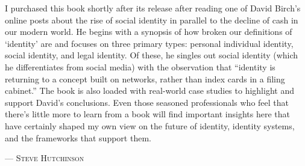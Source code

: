I purchased this book shortly after its release after reading one of David Birch’s online posts about the rise of social identity in parallel to the decline of cash in our modern world. He begins with a synopsis of how broken our definitions of ‘identity’ are and focuses on three primary types: personal individual identity, social identity, and legal identity. Of these, he singles out social identity (which he differentiates from social media) with the observation that “identity is returning to a concept built on networks, rather than index cards in a filing cabinet.” The book is also loaded with real-world case studies to highlight and support David’s conclusions. Even those seasoned professionals who feel that there’s little more to learn from a book will find important insights here that have certainly shaped my own view on the future of identity, identity systems, and the frameworks that support them. 
\setlength{\parindent}{0cm}\par\textsc{ --- Steve Hutchinson }\par\vspace{12pt}\setlength{\parindent}{15pt}
